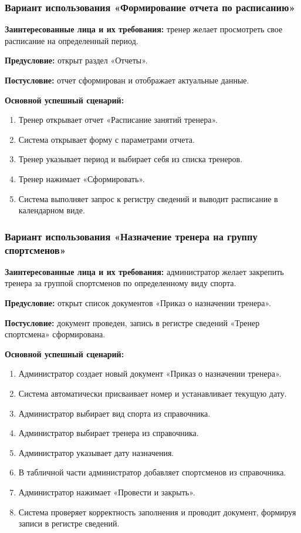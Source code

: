 \subsubsection{Вариант использования «Формирование отчета по расписанию»}

\textbf{Заинтересованные лица и их требования:} тренер желает просмотреть свое расписание на определенный период.

\textbf{Предусловие:} открыт раздел «Отчеты».

\textbf{Постусловие:} отчет сформирован и отображает актуальные данные.

\textbf{Основной успешный сценарий:}

\begin{enumerate}
	\item Тренер открывает отчет «Расписание занятий тренера».
	\item Система открывает форму с параметрами отчета.
	\item Тренер указывает период и выбирает себя из списка тренеров.
	\item Тренер нажимает «Сформировать».
	\item Система выполняет запрос к регистру сведений и выводит расписание в календарном виде.
\end{enumerate}

\subsubsection{Вариант использования «Назначение тренера на группу спортсменов»}

\textbf{Заинтересованные лица и их требования:} администратор желает закрепить тренера за группой спортсменов по определенному виду спорта.

\textbf{Предусловие:} открыт список документов «Приказ о назначении тренера».

\textbf{Постусловие:} документ проведен, запись в регистре сведений «Тренер спортсмена» сформирована.

\textbf{Основной успешный сценарий:}

\begin{enumerate}
	\item Администратор создает новый документ «Приказ о назначении тренера».
	\item Система автоматически присваивает номер и устанавливает текущую дату.
	\item Администратор выбирает вид спорта из справочника.
	\item Администратор выбирает тренера из справочника.
	\item Администратор указывает дату назначения.
	\item В табличной части администратор добавляет спортсменов из справочника.
	\item Администратор нажимает «Провести и закрыть».
	\item Система проверяет корректность заполнения и проводит документ, формируя записи в регистре сведений.
\end{enumerate}

